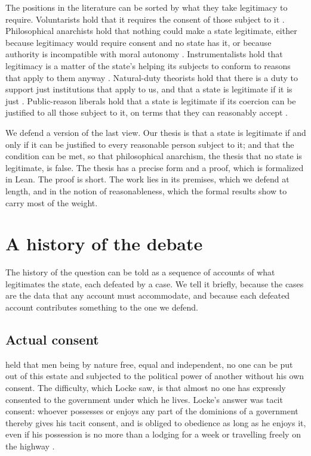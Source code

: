 \documentclass{situationist-preprint}
\begin{document}
The positions in the literature can be sorted by what they take legitimacy to require. Voluntarists hold that it requires the consent of those subject to it \citep{Locke1689,Simmons1979}. Philosophical anarchists hold that nothing could make a state legitimate, either because legitimacy would require consent and no state has it, or because authority is incompatible with moral autonomy \citep{Wolff1970,Huemer2013}. Instrumentalists hold that legitimacy is a matter of the state's helping its subjects to conform to reasons that apply to them anyway \citep{Raz1986}. Natural-duty theorists hold that there is a duty to support just institutions that apply to us, and that a state is legitimate if it is just \citep{Rawls1971,Waldron1993}. Public-reason liberals hold that a state is legitimate if its coercion can be justified to all those subject to it, on terms that they can reasonably accept \citep{Rawls1993,Gaus2011,Quong2011}.

We defend a version of the last view. Our thesis is that a state is legitimate if and only if it can be justified to every reasonable person subject to it; and that the condition can be met, so that philosophical anarchism, the thesis that no state is legitimate, is false. The thesis has a precise form and a proof, which is formalized in Lean. The proof is short. The work lies in its premises, which we defend at length, and in the notion of reasonableness, which the formal results show to carry most of the weight.

\section{A history of the debate}

The history of the question can be told as a sequence of accounts of what legitimates the state, each defeated by a case. We tell it briefly, because the cases are the data that any account must accommodate, and because each defeated account contributes something to the one we defend.

\subsection{Actual consent}

\citet[\S\S 95--99]{Locke1689} held that men being by nature free, equal and independent, no one can be put out of this estate and subjected to the political power of another without his own consent. The difficulty, which Locke saw, is that almost no one has expressly consented to the government under which he lives. Locke's answer was tacit consent: whoever possesses or enjoys any part of the dominions of a government thereby gives his tacit consent, and is obliged to obedience as long as he enjoys it, even if his possession is no more than a lodging for a week or travelling freely on the highway \citep[\S 119]{Locke1689}.
\end{document}
